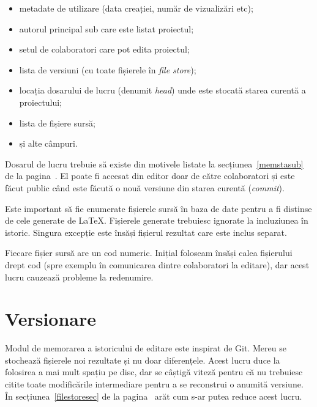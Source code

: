 \documentclass[a4wide,12pt]{report}
\newcommand{\eng}[1]{\emph{#1}} %
\newcommand{\acr}[1]{{\textsmaller[1]{\textsc{#1}}}} %
\begin{document}
\begin{itemize}

\item metadate de utilizare (data creației, număr de vizualizări etc);

\item autorul principal sub care este listat proiectul;

\item setul de colaboratori care pot edita proiectul;

\item lista de versiuni (cu toate fișierele în \eng{file store});

\item locația dosarului de lucru (denumit \eng{head}) unde este stocată starea
curentă a proiectului;

\item lista de fișiere sursă;

\item și alte câmpuri.

\end{itemize}

Dosarul de lucru trebuie să existe din motivele listate la
secțiunea~\ref{memstasub} de la pagina~\pageref{memstasub}. El poate fi accesat
din editor doar de către colaboratori și este făcut public când este făcută o
nouă versiune din starea curentă (\eng{commit}).

Este important să fie enumerate fișierele sursă în baza de date pentru a fi
distinse de cele generate de \LaTeX{}. Fișierele generate trebuiesc ignorate la
incluziunea în istoric. Singura excepție este însăși fișierul \acr{PDF} rezultat
care este inclus separat.

Fiecare fișier sursă are un cod numeric. Inițial foloseam însăși calea
fișierului drept cod (spre exemplu în comunicarea dintre colaboratori la
editare), dar acest lucru cauzează probleme la redenumire.

\section{Versionare}

Modul de memorarea a istoricului de editare este inspirat de Git. Mereu se
stochează fișierele noi rezultate și nu doar diferențele. Acest lucru duce la
folosirea a mai mult spațiu pe disc, dar se câștigă viteză pentru că nu
trebuiesc citite toate modificările intermediare pentru a se reconstrui o
anumită versiune. În secțiunea~\ref{filestoresec} de la
pagina~\pageref{filestoresec} arăt cum s-ar putea reduce acest lucru.
\end{document}
